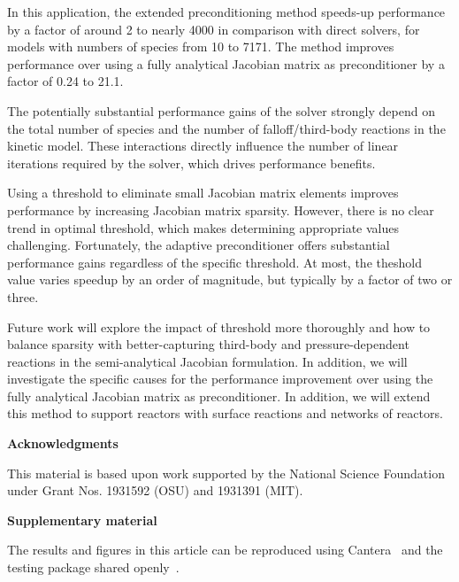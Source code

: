 \documentclass[twocolumn,10pt]{article}
\renewcommand{\section}%
              [1]%
              {%
               \bgroup%
               \flushleft%
               \small\bf%
               \stepcounter{section}%
               \arabic{section}. #1%
               \par%
               \egroup%
              }%
\newcommand{\acknowledgement}%
              [1]%
              {%
               \bgroup%
               \flushleft%
               \small\bf%
               #1%
               \par%
               \egroup%
              }%
\newcommand{\sectionOne}[1]{\section{#1} \addvspace{10pt}}
\newcommand{\revised}[2]{#1}  %
\begin{document}
In this application, the extended preconditioning method speeds-up performance by a factor of around 2 to nearly 4000 in comparison with direct solvers, for models with numbers of species from 10 to 7171. 
\revised{The method improves performance over using a fully analytical Jacobian matrix as preconditioner by a factor of 0.24 to 21.1.}{revTwo}

The potentially substantial performance gains of the solver strongly depend on the total number of species and the number of falloff\slash third-body reactions in the kinetic model.
These interactions directly influence the number of linear iterations required by the solver, which drives performance benefits.

\revised{Using a threshold to eliminate small Jacobian matrix elements improves performance by increasing Jacobian matrix sparsity.
However, there is no clear trend in optimal threshold, which makes determining appropriate values challenging. 
Fortunately, the adaptive preconditioner offers substantial performance gains regardless of the specific threshold.
At most, the theshold value varies speedup by an order of magnitude, but typically by a factor of two or three.}{revOne}

Future work will explore \revised{the impact of threshold more thoroughly and}{revOne} how to balance sparsity with better-capturing third-body and pressure-dependent reactions in the semi-analytical Jacobian formulation.
\revised{In addition, we will investigate the specific causes for the performance improvement over using the fully analytical Jacobian matrix as preconditioner.}{revOne}
In addition, we will extend this method to support reactors with surface reactions and networks of reactors.


\acknowledgement{Acknowledgments} \addvspace{10pt}

This material is based upon work supported by the National Science Foundation under Grant Nos. 1931592 (OSU) and 1931391 (MIT).


\acknowledgement{Supplementary material} \addvspace{10pt}

The results and figures in this article can be reproduced using Cantera~\cite{cantera} and the testing package shared openly~\cite{testing_package}.
\end{document}
